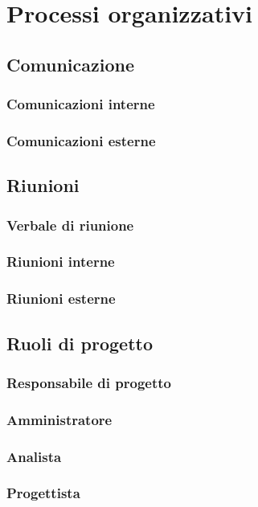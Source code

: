 \documentclass[NormeDiProgetto.tex]{subfiles}
\begin{document}
	
	\chapter{Processi organizzativi}
	
	\section{Comunicazione}
	\subsection{Comunicazioni interne}
	\subsection{Comunicazioni esterne}
	
	\section{Riunioni}
	\subsection{Verbale di riunione}
	\subsection{Riunioni interne}
	\subsection{Riunioni esterne}
	
	\section{Ruoli di progetto}
	\subsection{Responsabile di progetto}
	\subsection{Amministratore}
	\subsection{Analista}
	\subsection{Progettista}
\end{document}
